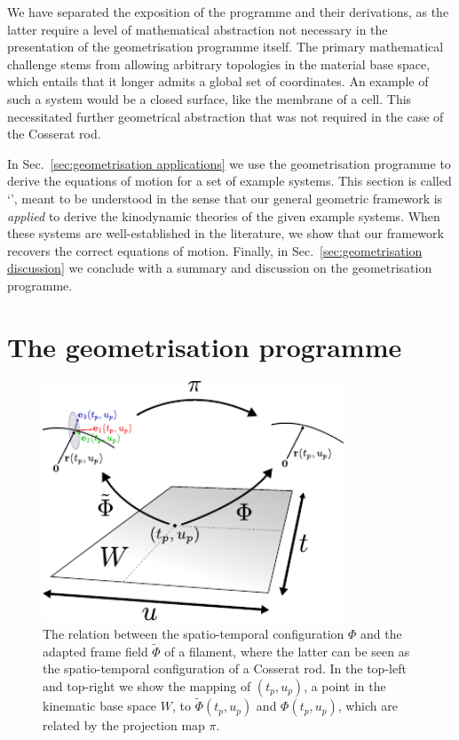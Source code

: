 We have separated the exposition of the programme and their derivations, as the latter require a level of mathematical abstraction not necessary in the presentation of the geometrisation programme itself. The primary mathematical challenge stems from allowing arbitrary topologies in the material base space, which entails that it longer admits a global set of coordinates. An example of such a system would be a closed surface, like the membrane of a cell. This necessitated further geometrical abstraction that was not required in the case of the Cosserat rod. 

In Sec.~\ref{sec:geometrisation applications} we use the geometrisation programme to derive the equations of motion for a set of example systems. This section is called `', meant to be understood in the sense that our general geometric framework is \emph{applied} to derive the kinodynamic theories of the given example systems. When these systems are well-established in the literature, we show that our framework recovers the correct equations of motion. Finally, in Sec.~\ref{sec:geometrisation discussion} we conclude with a summary and discussion on the geometrisation programme.

\section{The geometrisation programme} \label{sec:The geometrisation programme}

\begin{figure}[t]
\centering
        \includegraphics[width=0.8\textwidth]{figs_part2/ch8_geometrisation/cosserat_geometrisation.pdf}
        \caption{The relation between the spatio-temporal configuration $\Phi$ and the adapted frame field $\tilde{\Phi}$ of a filament, where the latter can be seen as the spatio-temporal configuration of a Cosserat rod. In the top-left and top-right we show the mapping of $(t_p, u_p)$, a point in the kinematic base space $W$, to $\tilde{\Phi}(t_p, u_p)$ and $\Phi(t_p, u_p)$, which are related by the projection map $\pi$.}\label{fig:cosserat rod geometrisation illustration}
\end{figure}

